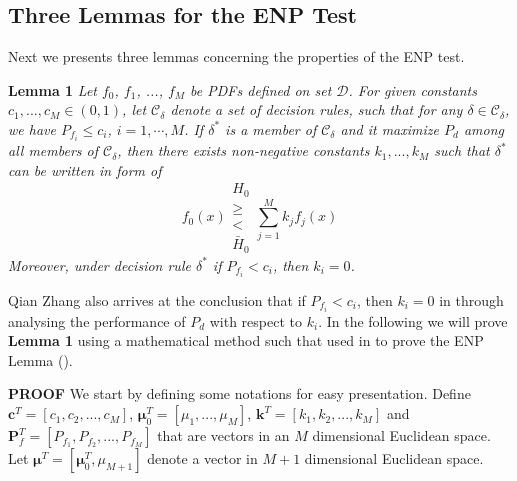 \subsection{Three Lemmas for the ENP Test}
Next we presents three lemmas concerning the properties of the ENP test.

\noindent \textbf{Lemma 1}
\noindent \textit{
Let $f_0$, $f_1$, ..., $f_M$ be PDFs defined on set $\mathcal{D}$. For given constants $c_1, ..., c_M \in (0, 1)$, let $\mathcal{C}_\delta$ denote a set of decision rules,  such that for any $\delta \in \mathcal{C}_\delta$, we have $P_{f_i} \leq c_i$, $i = 1, \cdots, M$.
If  $\delta^{\ast}$ is a member of $\mathcal{C}_\delta$ and it maximize $P_d$ among all members of $\mathcal{C}_\delta$, then there exists non-negative constants $k_1, ..., k_M$ such that $\delta^\ast$ can be written in form of  
\begin{equation}
f_0(x) \substack{H_0 \\ \geq \\ < \\ \bar{H}_0} \sum_{j=1}^{M}k_jf_j(x)
\end{equation}
Moreover, under decision rule $\delta^\ast$ if  $P_{f_i} < c_i$, then $k_i = 0$. 
}

Qian Zhang also arrives at the conclusion that if $P_{f_i} < c_i$, then $k_i = 0$ in \cite{zhang1999design, zhang2000efficient} through analysing the performance of $P_d$ with respect to $k_i$. In the following we will prove \textbf{Lemma 1} using a mathematical method such that used in \cite{LehmannTest, dantzig1951fundamental} to prove the ENP Lemma ().

\noindent\textbf{PROOF}
\newcommand{\bmu}{\boldsymbol{\mu}}
We start by defining 
 some notations for easy presentation.
Define $\mathbf{c}^T = [c_1, c_2, ..., c_M]$, $\boldsymbol{\mu}_0^T = [\mu_1, ..., \mu_M]$, $\mathbf{k}^T = [k_1, k_2, ..., k_M]$ and  $\mathbf{P}_f^T = [P_{f_1}, P_{f_2}, ..., P_{f_M}]$ that are vectors in an $M$ dimensional Euclidean  space. Let $\bmu^T = [\bmu_0^T, \mu_{M+1}]$ denote a vector in $M+1$ dimensional Euclidean space. 

